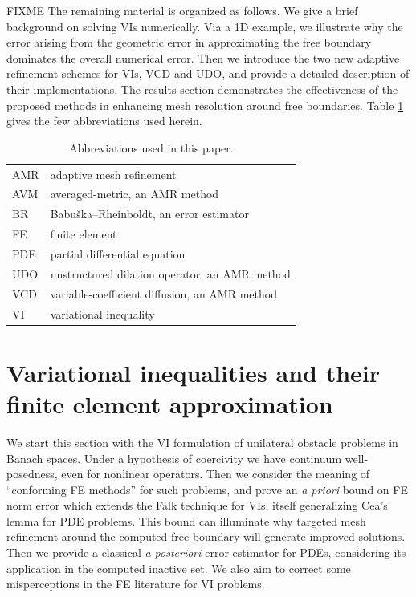 \documentclass[]{interact}
\theoremstyle{plain}%
\theoremstyle{definition}
\theoremstyle{remark}
\begin{document}
FIXME The remaining material is organized as follows.  We give a brief background on solving VIs numerically.  Via a 1D example, we illustrate why the error arising from the geometric error in approximating the free boundary dominates the overall numerical error.   Then we introduce the two new adaptive refinement schemes for VIs, VCD and UDO, and provide a detailed description of their implementations.  The results section demonstrates the effectiveness of the proposed methods in enhancing mesh resolution around free boundaries.  Table \ref{tab:abbrev} gives the few abbreviations used herein.

\begin{table}[ht]
\centering
\begin{tabular}{ll}
AMR       & adaptive mesh refinement \\
AVM       & averaged-metric, an AMR method \\
BR        & Babu\v{s}ka--Rheinboldt, an error estimator \\
FE        & finite element \\
PDE       & partial differential equation \\
UDO       & unstructured dilation operator, an AMR method \\
VCD       & variable-coefficient diffusion, an AMR method \\
VI        & variational inequality
\end{tabular}

\caption{Abbreviations used in this paper.}
\label{tab:abbrev}
\end{table}


\section{Variational inequalities and their finite element approximation} \label{sec:vifem}

We start this section with the VI formulation of unilateral obstacle problems in Banach spaces.  Under a hypothesis of coercivity we have continuum well-posedness, even for nonlinear operators.  Then we consider the meaning of ``conforming FE methods'' for such problems, and prove an \emph{a priori} bound on FE norm error which extends the Falk \cite{Falk1974} technique for VIs, itself generalizing Cea's lemma \cite{ElmanSilvesterWathen2014} for PDE problems.  This bound can illuminate why targeted mesh refinement around the computed free boundary will generate improved solutions.  Then we provide a classical \emph{a posteriori} error estimator for PDEs, considering its application in the computed inactive set.  We also aim to correct some misperceptions in the FE literature for VI problems.
\end{document}
